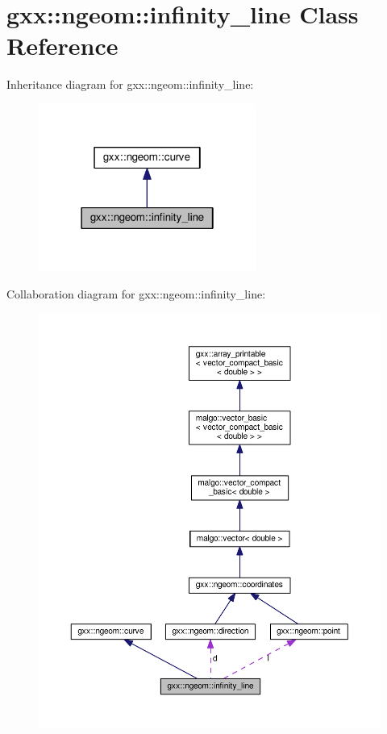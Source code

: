 \hypertarget{classgxx_1_1ngeom_1_1infinity__line}{}\section{gxx\+:\+:ngeom\+:\+:infinity\+\_\+line Class Reference}
\label{classgxx_1_1ngeom_1_1infinity__line}


Inheritance diagram for gxx\+:\+:ngeom\+:\+:infinity\+\_\+line\+:
\nopagebreak
\begin{figure}[H]
\begin{center}
\leavevmode
\includegraphics[width=202pt]{classgxx_1_1ngeom_1_1infinity__line__inherit__graph}
\end{center}
\end{figure}


Collaboration diagram for gxx\+:\+:ngeom\+:\+:infinity\+\_\+line\+:
\nopagebreak
\begin{figure}[H]
\begin{center}
\leavevmode
\includegraphics[width=350pt]{classgxx_1_1ngeom_1_1infinity__line__coll__graph}
\end{center}
\end{figure}
